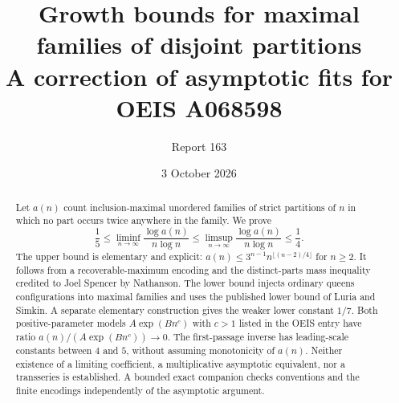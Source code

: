 \documentclass[11pt,letterpaper]{article}
\title{Growth bounds for maximal families of disjoint partitions\\\large A correction of asymptotic fits for OEIS A068598}
\author{Report 163}
\date{3 October 2026}
\numberwithin{equation}{section}
\theoremstyle{remark}\newtheorem{remark}[theorem]{Remark}
\begin{document}
\maketitle
\begin{abstract}
Let $a(n)$ count inclusion-maximal unordered families of strict partitions
of $n$ in which no part occurs twice anywhere in the family. We prove
\[
 \frac15\le\liminf_{n\to\infty}\frac{\log a(n)}{n\log n}
 \le\limsup_{n\to\infty}\frac{\log a(n)}{n\log n}\le\frac14.
\]
The upper bound is elementary and explicit:
$a(n)\le 3^{n-1}n^{\lfloor(n-2)/4\rfloor}$ for $n\ge2$.
It follows from a recoverable-maximum encoding and the distinct-parts
mass inequality credited to Joel Spencer by Nathanson. The lower bound
injects ordinary queens configurations into maximal families and uses
the published lower bound of Luria and Simkin. A separate elementary
construction gives the weaker lower constant $1/7$.
Both positive-parameter models $A\exp(Bn^c)$ with $c>1$ listed in the
OEIS entry have ratio $a(n)/(A\exp(Bn^c))\to0$.
The first-passage inverse has leading-scale constants between $4$ and $5$,
without assuming monotonicity of $a(n)$. Neither existence of a limiting
coefficient, a multiplicative asymptotic equivalent, nor a transseries
is established. A bounded exact companion checks conventions and the
finite encodings independently of the asymptotic argument.
\end{abstract}
\end{document}
